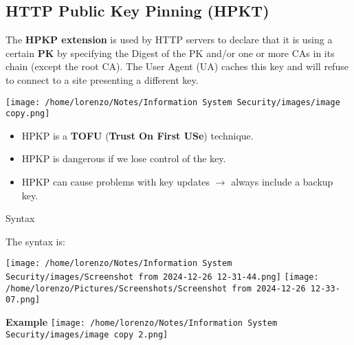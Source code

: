 \subsection{HTTP Public Key Pinning (HPKT)}
\begin{minipage}{0.7\textwidth}
The \textbf{HPKP extension} is used by HTTP servers to declare that it is using a certain \textbf{PK} by specifying the Digest of the PK and/or one or more CAs in its chain (except the root CA). The User Agent (UA) caches this key and will refuse to connect to a site presenting a different key. 
\end{minipage} 
\hspace{0.3cm}
\begin{minipage}{0.3\textwidth}
    \centering
    \texttt{[image: /home/lorenzo/Notes/Information System Security/images/image copy.png]}
\end{minipage}

\begin{itemize}
    \item HPKP is a \textbf{TOFU} (\textbf{Trust On First USe}) technique.
    \item HPKP is dangerous if we lose control of the key.
    \item HPKP can cause problems with key updates \(\rightarrow \) always include a backup key.
\end{itemize}
\begin{quotebox-grey}{Syntax}
    \begin{minipage}{0.4\textwidth}
        The syntax is:
        \begin{center}
            \texttt{[image: /home/lorenzo/Notes/Information System Security/images/Screenshot from 2024-12-26 12-31-44.png]} 
            \vspace{1cm}
            \texttt{[image: /home/lorenzo/Pictures/Screenshots/Screenshot from 2024-12-26 12-33-07.png]} 
        \end{center} 
    \end{minipage} 
    \hspace{0.5cm}
    \begin{minipage}{0.4\textwidth}
        \textbf{Example}
        \centering
        \texttt{[image: /home/lorenzo/Notes/Information System Security/images/image copy 2.png]}
    \end{minipage}
\end{quotebox-grey}


